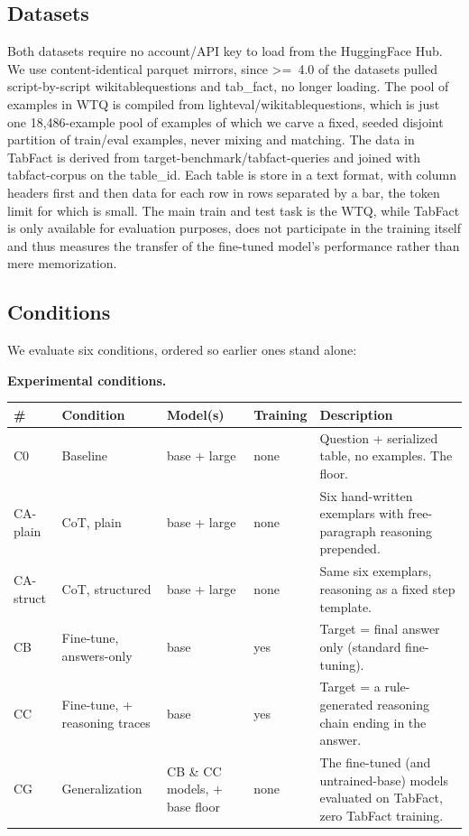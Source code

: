\documentclass[sigconf]{acmart}
\begin{document}
\subsection{Datasets}
Both datasets require no account/API key to load from the HuggingFace Hub. We use content-identical parquet mirrors, since \textgreater{}=~4.0 of the datasets pulled script-by-script wikitablequestions and tab\_fact, no longer loading. The pool of examples in WTQ is compiled from lighteval/wikitablequestions, which is just one 18,486-example pool of examples of which we carve a fixed, seeded disjoint partition of train/eval examples, never mixing and matching. The data in TabFact is derived from target-benchmark/tabfact-queries and joined with tabfact-corpus on the table\_id. Each table is store in a text format, with column headers first and then data for each row in rows separated by a bar, the token limit for which is small. The main train and test task is the WTQ, while TabFact is only available for evaluation purposes, does not participate in the training itself and thus measures the transfer of the fine-tuned model's performance rather than mere memorization.

\subsection{Conditions}
We evaluate six conditions, ordered so earlier ones stand alone:

\begin{table}[t]
\centering
{\normalsize\textbf{Experimental conditions.}}\par\smallskip
\setlength{\tabcolsep}{6pt}\small
\begin{tabular}{@{}llllp{}@{}}
\toprule
\# & Condition & Model(s) & Training & Description \\
\midrule
C0 & Baseline & base + large & none & Question + serialized table, no examples. The floor. \\
CA-plain & CoT, plain & base + large & none & Six hand-written exemplars with free-paragraph reasoning prepended. \\
CA-struct & CoT, structured & base + large & none & Same six exemplars, reasoning as a fixed step template. \\
CB & Fine-tune, answers-only & base & yes & Target = final answer only (standard fine-tuning). \\
CC & Fine-tune, + reasoning traces & base & yes & Target = a rule-generated reasoning chain ending in the answer. \\
CG & Generalization & CB \& CC models, + base floor & none & The fine-tuned (and untrained-base) models evaluated on TabFact, zero TabFact training. \\
\bottomrule
\end{tabular}
\end{table}
\end{document}
